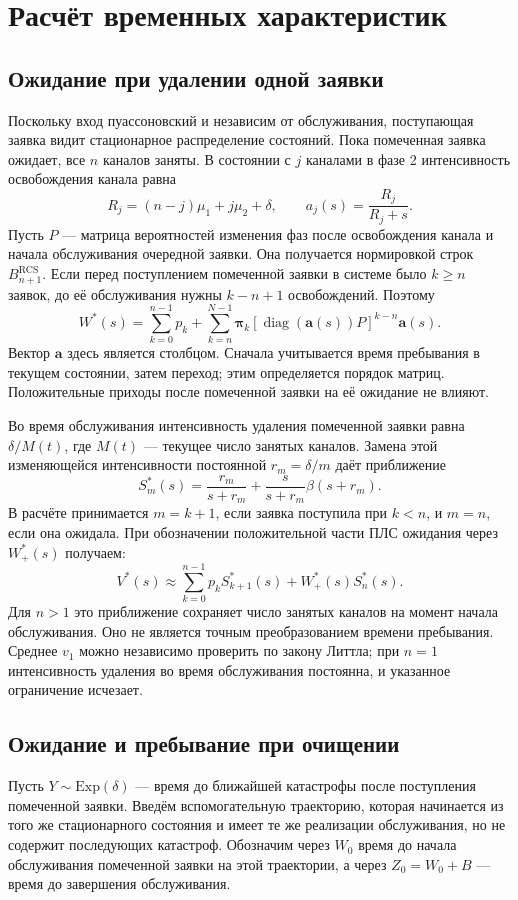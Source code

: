 \section{Расчёт временных характеристик}\label{sec:times}
\subsection{Ожидание при удалении одной заявки}
Поскольку вход пуассоновский и независим от обслуживания, поступающая заявка видит стационарное распределение состояний. Пока помеченная заявка ожидает, все \(n\) каналов заняты. В состоянии с \(j\) каналами в фазе 2 интенсивность освобождения канала равна
\[
R_j=(n-j)\mu_1+j\mu_2+\delta,\qquad a_j(s)=\frac{R_j}{R_j+s}.
\]
Пусть \(P\) --- матрица вероятностей изменения фаз после освобождения канала и начала обслуживания очередной заявки. Она получается нормировкой строк \(B_{n+1}^{\mathrm{RCS}}\). Если перед поступлением помеченной заявки в системе было \(k\ge n\) заявок, до её обслуживания нужны \(k-n+1\) освобождений. Поэтому
\[
W^*(s)=\sum_{k=0}^{n-1}p_k+
\sum_{k=n}^{N-1}\boldsymbol\pi_k
\left[\operatorname{diag}(\boldsymbol a(s))P\right]^{k-n}\boldsymbol a(s).
\]
Вектор \(\boldsymbol a\) здесь является столбцом. Сначала учитывается время пребывания в текущем состоянии, затем переход; этим определяется порядок матриц. Положительные приходы после помеченной заявки на её ожидание не влияют.

Во время обслуживания интенсивность удаления помеченной заявки равна \(\delta/M(t)\), где \(M(t)\) --- текущее число занятых каналов. Замена этой изменяющейся интенсивности постоянной \(r_m=\delta/m\) даёт приближение
\[
S_m^*(s)=\frac{r_m}{s+r_m}+\frac{s}{s+r_m}\beta(s+r_m).
\]
В расчёте принимается \(m=k+1\), если заявка поступила при \(k<n\), и \(m=n\), если она ожидала. При обозначении положительной части ПЛС ожидания через \(W_+^*(s)\) получаем:
\[
V^*(s)\approx\sum_{k=0}^{n-1}p_k S_{k+1}^*(s)+W_+^*(s)S_n^*(s).
\]
Для \(n>1\) это приближение сохраняет число занятых каналов на момент начала обслуживания. Оно не является точным преобразованием времени пребывания. Среднее \(v_1\) можно независимо проверить по закону Литтла; при \(n=1\) интенсивность удаления во время обслуживания постоянна, и указанное ограничение исчезает.

\subsection{Ожидание и пребывание при очищении}
Пусть \(Y\sim\mathrm{Exp}(\delta)\) --- время до ближайшей катастрофы после поступления помеченной заявки. Введём вспомогательную траекторию, которая начинается из того же стационарного состояния и имеет те же реализации обслуживания, но не содержит последующих катастроф. Обозначим через \(W_0\) время до начала обслуживания помеченной заявки на этой траектории, а через \(Z_0=W_0+B\) --- время до завершения обслуживания.

